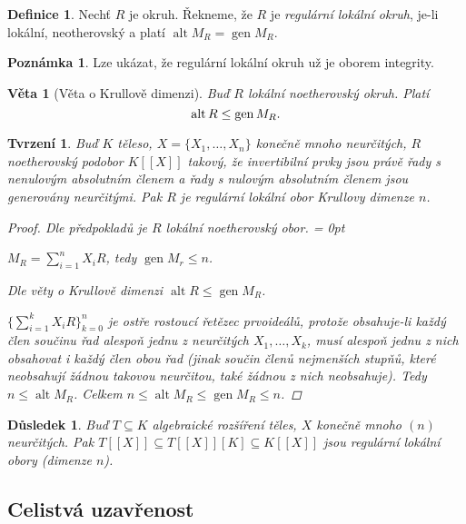 \documentclass[11pt,a4paper]{article}
\newcommand*{\ml}[1]{\[\textstyle\let\displaystyle\textstyle#1\]}	%
\DeclareMathOperator{\alt}{alt} %
\DeclareMathOperator{\gen}{gen} %
\newenvironment{items}{%
	\itemize
	\itemsep = 0pt%
}{%
	\enditemize
}
\newcounter{numb}
\theoremstyle{definition}
\newtheorem*{definice}{Definice}
\newtheorem{poznamka}[numb]{Poznámka}
\theoremstyle{plain}
\newtheorem{veta}[numb]{Věta}
\newtheorem{tvrzeni}[numb]{Tvrzení}
\newtheorem{dusledek}[numb]{Důsledek}
\begin{document}
\begin{definice}
	Nechť $R$ je okruh. Řekneme, že $R$ je \emph{regulární lokální okruh}, je-li lokální, neotherovský a platí $\alt M_R = \gen M_R$.
\end{definice}

\begin{poznamka}
	Lze ukázat, že regulární lokální okruh už je oborem integrity.
\end{poznamka}

\begin{veta}[Věta o Krullově dimenzi]
	Buď $R$ lokální noetherovský okruh. Platí
	\ml{
		\alt R \leq \gen M_R.
	}
\end{veta}

\begin{tvrzeni} \label{thm:R_reg}
	Buď $K$ těleso, $X = \{X_1, \hdots, X_n\}$ konečně mnoho neurčitých, $R$ noetherovský podobor $K[[X]]$ takový, že invertibilní prvky jsou právě řady s nenulovým absolutním členem a řady s nulovým absolutním členem jsou generovány neurčitými. Pak $R$ je regulární lokální obor Krullovy dimenze $n$.

	\begin{proof}
		Dle předpokladů je $R$ lokální noetherovský obor.
		\begin{items}
			\item $M_R = \sum_{i = 1}^n X_i R$, tedy $\gen M_r \leq n$.
			\item Dle věty o Krullově dimenzi $\alt R \leq \gen M_R$.
			\item $\{\sum_{i = 1}^k X_i R\}_{k = 0}^n$ je ostře rostoucí řetězec prvoideálů, protože obsahuje-li každý člen součinu řad alespoň jednu z neurčitých $X_1, \hdots, X_k$, musí alespoň jednu z nich obsahovat i každý člen obou řad (jinak součin členů nejmenších stupňů, které neobsahují žádnou takovou neurčitou, také žádnou z nich neobsahuje). Tedy $n \leq \alt M_R$.
		\end{items}
		Celkem $n \leq \alt M_R \leq \gen M_R \leq n$.
	\end{proof}
\end{tvrzeni}

\begin{dusledek} \label{thm:reg}
	Buď $T \subseteq K$ algebraické rozšíření těles, $X$ konečně mnoho $(n)$ neurčitých. Pak $T[[X]] \subseteq T[[X]][K] \subseteq K[[X]]$ jsou regulární lokální obory (dimenze $n$).
\end{dusledek}


\subsection{Celistvá uzavřenost}
\end{document}
